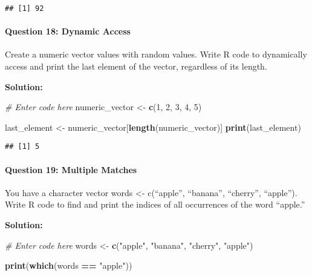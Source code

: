 \documentclass[
]{article}
\newenvironment{Shaded}{\begin{snugshade}}{\end{snugshade}}
\newcommand{\CommentTok}[1]{\textcolor[rgb]{0.56,0.35,0.01}{\textit{#1}}}
\newcommand{\DecValTok}[1]{\textcolor[rgb]{0.00,0.00,0.81}{#1}}
\newcommand{\FunctionTok}[1]{\textcolor[rgb]{0.13,0.29,0.53}{\textbf{#1}}}
\newcommand{\NormalTok}[1]{#1}
\newcommand{\OtherTok}[1]{\textcolor[rgb]{0.56,0.35,0.01}{#1}}
\newcommand{\SpecialCharTok}[1]{\textcolor[rgb]{0.81,0.36,0.00}{\textbf{#1}}}
\newcommand{\StringTok}[1]{\textcolor[rgb]{0.31,0.60,0.02}{#1}}
\begin{document}
\begin{verbatim}
## [1] 92
\end{verbatim}

\hypertarget{question-18-dynamic-access}{%
\paragraph{Question 18: Dynamic
Access}\label{question-18-dynamic-access}}

Create a numeric vector values with random values. Write R code to
dynamically access and print the last element of the vector, regardless
of its length.

\textbf{Solution:}

\begin{Shaded}
\begin{Highlighting}[]
\CommentTok{\# Enter code here}
\NormalTok{numeric\_vector }\OtherTok{\textless{}{-}} \FunctionTok{c}\NormalTok{(}\DecValTok{1}\NormalTok{, }\DecValTok{2}\NormalTok{, }\DecValTok{3}\NormalTok{, }\DecValTok{4}\NormalTok{, }\DecValTok{5}\NormalTok{)}

\NormalTok{last\_element }\OtherTok{\textless{}{-}}\NormalTok{ numeric\_vector[}\FunctionTok{length}\NormalTok{(numeric\_vector)]}
\FunctionTok{print}\NormalTok{(last\_element)}
\end{Highlighting}
\end{Shaded}

\begin{verbatim}
## [1] 5
\end{verbatim}

\hypertarget{question-19-multiple-matches}{%
\paragraph{Question 19: Multiple
Matches}\label{question-19-multiple-matches}}

You have a character vector words \textless- c(``apple'', ``banana'',
``cherry'', ``apple''). Write R code to find and print the indices of
all occurrences of the word ``apple.''

\textbf{Solution:}

\begin{Shaded}
\begin{Highlighting}[]
\CommentTok{\# Enter code here}
\NormalTok{words }\OtherTok{\textless{}{-}} \FunctionTok{c}\NormalTok{(}\StringTok{"apple"}\NormalTok{, }\StringTok{"banana"}\NormalTok{, }\StringTok{"cherry"}\NormalTok{, }\StringTok{"apple"}\NormalTok{)}

\FunctionTok{print}\NormalTok{(}\FunctionTok{which}\NormalTok{(words }\SpecialCharTok{==} \StringTok{"apple"}\NormalTok{))}
\end{Highlighting}
\end{Shaded}
\end{document}
